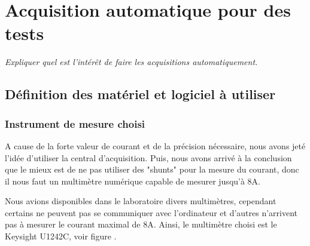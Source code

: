 \chapter{Acquisition automatique pour des tests}
\label{chap:quatriemechapitre}

\textit{Expliquer quel est l'intérêt de faire les acquisitions automatiquement.}


\section{Définition des matériel et logiciel à utiliser}

\subsection{Instrument de mesure choisi}

A cause de la forte valeur de courant et de la précision nécessaire, nous avons jeté l'idée d'utiliser la central d'acquisition. Puis, nous avons arrivé à la conclusion que le mieux est de ne pas utiliser des "shunts" pour la mesure du courant, donc il nous faut un multimètre numérique capable de mesurer jusqu'à 8A.

Nous avions disponibles dans le laboratoire divers multimètres, cependant certains ne peuvent pas se communiquer avec l'ordinateur et d'autres n'arrivent pas à mesurer le courant maximal de 8A. Ainsi, le multimètre choisi est le Keysight U1242C, voir figure .

